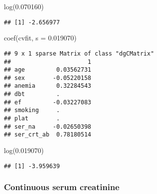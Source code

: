 \documentclass[
]{article}
\newenvironment{Shaded}{\begin{snugshade}}{\end{snugshade}}
\newcommand{\AttributeTok}[1]{\textcolor[rgb]{0.77,0.63,0.00}{#1}}
\newcommand{\FloatTok}[1]{\textcolor[rgb]{0.00,0.00,0.81}{#1}}
\newcommand{\FunctionTok}[1]{\textcolor[rgb]{0.00,0.00,0.00}{#1}}
\newcommand{\NormalTok}[1]{#1}
\begin{document}
\begin{Shaded}
\begin{Highlighting}[]
\FunctionTok{log}\NormalTok{(}\FloatTok{0.070160}\NormalTok{)}
\end{Highlighting}
\end{Shaded}

\begin{verbatim}
## [1] -2.656977
\end{verbatim}

\begin{Shaded}
\begin{Highlighting}[]
\FunctionTok{coef}\NormalTok{(cvfit, }\AttributeTok{s =} \FloatTok{0.019070}\NormalTok{)}
\end{Highlighting}
\end{Shaded}

\begin{verbatim}
## 9 x 1 sparse Matrix of class "dgCMatrix"
##                      1
## age         0.03562731
## sex        -0.05220158
## anemia      0.32284543
## dbt         .         
## ef         -0.03227083
## smoking     .         
## plat        .         
## ser_na     -0.02650398
## ser_crt_ab  0.78180514
\end{verbatim}

\begin{Shaded}
\begin{Highlighting}[]
\FunctionTok{log}\NormalTok{(}\FloatTok{0.019070}\NormalTok{)}
\end{Highlighting}
\end{Shaded}

\begin{verbatim}
## [1] -3.959639
\end{verbatim}

\hypertarget{continuous-serum-creatinine}{%
\subsubsection{Continuous serum
creatinine}\label{continuous-serum-creatinine}}
\end{document}
